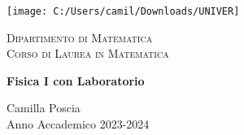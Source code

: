 \documentclass[italian,11pt,a4paper]{report}
\begin{document}
	
	\begin{titlepage}
		\centering
		\texttt{[image: C:/Users/camil/Downloads/UNIVER]} 
		
		\vspace{1cm}
		
		\textsc{\Large Dipartimento di Matematica} \\
		\vspace{0.5cm}
		\textsc{\large Corso di Laurea in Matematica} \\
		
		\vspace{3cm}
		
		\LARGE \textbf{Fisica I con Laboratorio} \\
		
		\vspace{6cm}
		
		\large Camilla Poscia \\
		
		\vspace{0.2cm}
		Anno Accademico 2023-2024 \\
		
		\vspace{1cm}
	\end{titlepage}
	
\end{document}
